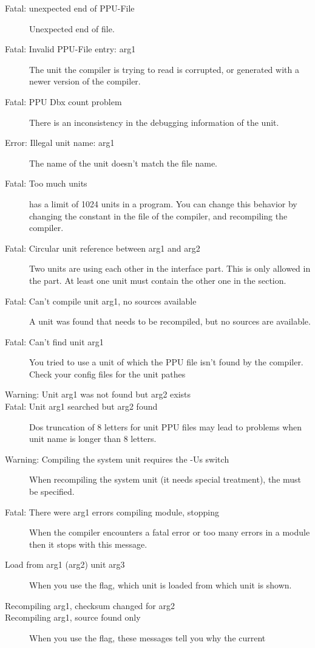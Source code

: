 \begin{description}
\item [Fatal: unexpected end of PPU-File]
 Unexpected end of file.
\item [Fatal: Invalid PPU-File entry: arg1]
 The unit the compiler is trying to read is corrupted, or generated with a
 newer version of the compiler.
\item [Fatal: PPU Dbx count problem]
 There is an inconsistency in the debugging information of the unit.
\item [Error: Illegal unit name: arg1]
 The name of the unit doesn't match the file name.
\item [Fatal: Too much units]
 \fpc has a limit of 1024 units in a program. You can change this behavior
 by changing the  constant in the  file of the
 compiler, and recompiling the compiler.
\item [Fatal: Circular unit reference between arg1 and arg2]
 Two units are using each other in the interface part. This is only allowed
 in the  part. At least one unit must contain the other one
 in the  section.
\item [Fatal: Can't compile unit arg1, no sources available]
 A unit was found that needs to be recompiled, but no sources are
 available.
\item [Fatal: Can't find unit arg1]
 You tried to use a unit of which the PPU file isn't found by the
 compiler. Check your config files for the unit pathes
\item [Warning: Unit arg1 was not found but arg2 exists]
\item [Fatal: Unit arg1 searched but arg2 found]
 Dos truncation of 8 letters for unit PPU files
 may lead to problems when unit name is longer than 8 letters.
\item [Warning: Compiling the system unit requires the -Us switch]
 When recompiling the system unit (it needs special treatment), the
  must be specified.
\item [Fatal: There were arg1 errors compiling module, stopping]
 When the compiler encounters a fatal error or too many errors in a module
 then it stops with this message.
\item [Load from arg1 (arg2) unit arg3]
 When you use the  flag, which unit is loaded from which unit is
 shown.
\item [Recompiling arg1, checksum changed for arg2]
\item [Recompiling arg1, source found only]
 When you use the  flag, these messages tell you why the current

\end{description}
